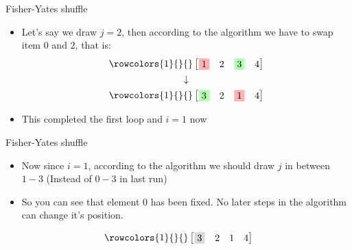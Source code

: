 \documentclass[10pt,xcolor={table,dvipsnames},t]{beamer}
\begin{document}
\begin{frame}{Fisher-Yates shuffle}
  \begin{itemize}
    \item Let's say we draw $j=2$, then according to the algorithm we have to swap item $0$ and $2$, that is:
    \begin{gather*}
      \rowcolors{1}{}{}
      \begin{bmatrix}
        \fcolorbox{black!0}{red!30}{$1$} & 2 & \fcolorbox{black!0}{green!30}{$3$} & 4
      \end{bmatrix}\\
      \downarrow\\
      \rowcolors{1}{}{}
      \begin{bmatrix}
        \fcolorbox{black!0}{green!30}{$3$} & 2 & \fcolorbox{black!0}{red!30}{$1$} & 4
      \end{bmatrix}
    \end{gather*}
    \item This completed the first loop and $i=1$ now
  \end{itemize}
\end{frame}

\begin{frame}{Fisher-Yates shuffle}
  \begin{itemize}
    \item Now since $i=1$, according to the algorithm we should draw $j$ in between $1-3$ (Instead of $0-3$ in last run)
    \item So you can see that element 0 has been fixed. No later steps in the algorithm can change it's position. 
  \end{itemize}
  \begin{align*}
    \rowcolors{1}{}{}
      \begin{bmatrix}
        \fcolorbox{black!0}{gray!30}{$3$} & 2 & 1 & 4
      \end{bmatrix}
  \end{align*}
\end{frame}
\end{document}
